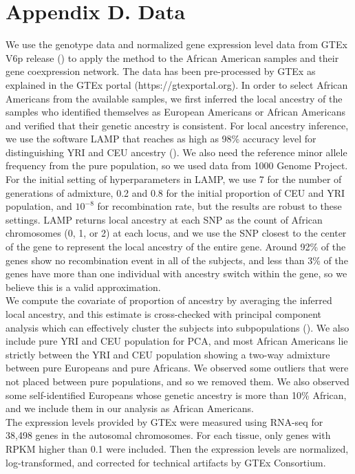 \documentclass[aoas,authoryear, preprint]{imsart}
\numberwithin{equation}{section}
\theoremstyle{plain}
\begin{document}
\section*{Appendix D. Data}
We use the genotype data and normalized gene expression level data from GTEx V6p release (\cite{lonsdale2013genotype}) to apply the method to the African American samples and their gene coexpression network. The data has been pre-processed by GTEx as explained in the GTEx portal (https://gtexportal.org). In order to select African Americans from the available samples, we first inferred the local ancestry of the samples who identified themselves as European Americans or African Americans and verified that their genetic ancestry is consistent. For local ancestry inference, we use the software LAMP that reaches as high as 98\% accuracy level for distinguishing YRI and CEU ancestry (\cite{pacsaniuc2009imputation}). We also need the reference minor allele frequency from the pure population, so we used data from 1000 Genome Project. For the initial setting of hyperparameters in LAMP, we use 7 for the number of generations of admixture, 0.2 and 0.8 for the initial proportion of CEU and YRI population, and $10^{-8}$ for recombination rate, but the results are robust to these settings. LAMP returns local ancestry at each SNP as the count of African chromosomes (0, 1, or 2) at each locus, and we use the SNP closest to the center of the gene to represent the local ancestry of the entire gene.  Around 92\% of the genes show no recombination event in all of the subjects, and less than 3\% of the genes have more than one individual with ancestry switch within the gene, so we believe this is a valid approximation. \\

We compute the covariate of proportion of ancestry by averaging the inferred local ancestry, and this estimate is cross-checked with principal component analysis which can effectively cluster the subjects into subpopulations (\cite{pritchard2000inference}). We also include pure YRI and CEU population for PCA, and most African Americans lie strictly between the YRI and CEU population showing a two-way admixture between pure Europeans and pure Africans. We observed some outliers that were not placed between pure populations, and so we removed them. We also observed some self-identified Europeans whose genetic ancestry is more than 10\% African, and we include them in our analysis as African Americans. \\

The expression levels provided by GTEx were measured using RNA-seq for 38,498 genes in the autosomal chromosomes. For each tissue, only genes with RPKM higher than 0.1 were included. Then the expression levels are normalized, log-transformed, and corrected for technical artifacts by GTEx Consortium. 
\end{document}
